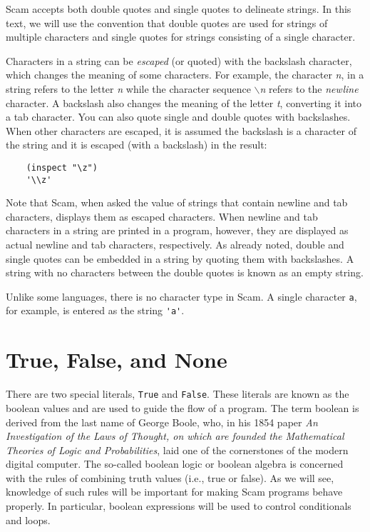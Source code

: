 Scam accepts both double quotes and single quotes to
delineate strings. In this text, we will use the convention
that double quotes are used for strings of multiple 
characters and single quotes for strings consisting of
a single character.

Characters in a string can be {\it escaped} (or quoted)
with the backslash character,
which changes the meaning of some characters. For example, the character
{\it n}, in a string refers to the letter {\it n} while the character sequence
{\it $\backslash$n}
refers
to the {\it newline} character. A backslash also changes the meaning of the
letter {\it t},
converting it into a tab character.
You can also quote single and double quotes with backslashes.
When other characters are escaped,
it is assumed the backslash is a character of the
string and it is escaped (with a backslash) in the result:

\begin{verbatim}
    (inspect "\z")
    '\\z'
\end{verbatim}

Note that Scam, when asked
the value of strings that contain newline and tab characters, displays
them as escaped characters. When newline and tab characters in a string
are printed in a program, however, they are displayed as actual newline
and tab characters, respectively.
As already noted,
double and single quotes can be embedded in a
string by quoting them with backslashes. A string with no characters
between the double quotes is known as an empty string.

Unlike some languages, there is no character type in Scam. A single
character {\verb+a+}, for example, is entered as the string
{\verb+'a'+}.

\section{True, False, and None}

There are two special literals, \verb!True! and \verb!False!.
These literals are known as the {\sc boolean} values
and are used to guide the flow of a program.
The term {\sc boolean} is derived from the last name of George Boole, who,
in his 1854 paper {\it An Investigation of the Laws of Thought, on which are
founded the Mathematical Theories of Logic and Probabilities}, laid one
of the cornerstones of the modern digital computer. The so-called {\sc boolean}
logic or {\sc boolean} algebra is concerned with the rules of combining truth
values (i.e., true or false). As we will see, knowledge of such rules will
be important for making Scam programs behave properly. In particular,
{\sc boolean} expressions will be used to control conditionals and loops.

